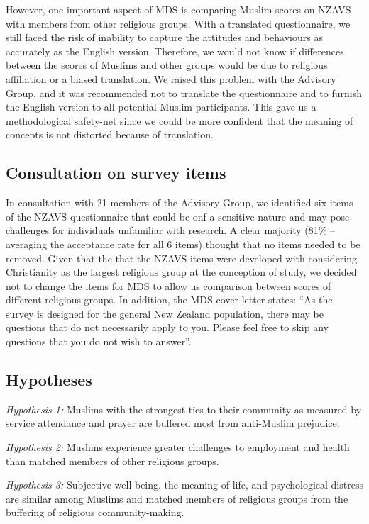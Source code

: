 \documentclass[
]{interact}
\begin{document}
However, one important aspect of MDS is comparing Muslim scores on NZAVS
with members from other religious groups. With a translated
questionnaire, we still faced the risk of inability to capture the
attitudes and behaviours as accurately as the English version.
Therefore, we would not know if differences between the scores of
Muslims and other groups would be due to religious affiliation or a
biased translation. We raised this problem with the Advisory Group, and
it was recommended not to translate the questionnaire and to furnish the
English version to all potential Muslim participants. This gave us a
methodological safety-net since we could be more confident that the
meaning of concepts is not distorted because of translation.

\subsection{Consultation on survey
items}\label{consultation-on-survey-items}

In consultation with 21 members of the Advisory Group, we identified six
items of the NZAVS questionnaire that could be onf a sensitive nature
and may pose challenges for individuals unfamiliar with research. A
clear majority (81\% -- averaging the acceptance rate for all 6 items)
thought that no items needed to be removed. Given that the that the
NZAVS items were developed with considering Christianity as the largest
religious group at the conception of study, we decided not to change the
items for MDS to allow us comparison between scores of different
religious groups. In addition, the MDS cover letter states: ``As the
survey is designed for the general New Zealand population, there may be
questions that do not necessarily apply to you. Please feel free to skip
any questions that you do not wish to answer''.

\subsection{Hypotheses}\label{hypotheses}

\emph{Hypothesis 1:} Muslims with the strongest ties to their community
as measured by service attendance and prayer are buffered most from
anti-Muslim prejudice.

\emph{Hypothesis 2:} Muslims experience greater challenges to employment
and health than matched members of other religious groups.

\emph{Hypothesis 3:} Subjective well-being, the meaning of life, and
psychological distress are similar among Muslims and matched members of
religious groups from the buffering of religious community-making.
\end{document}
